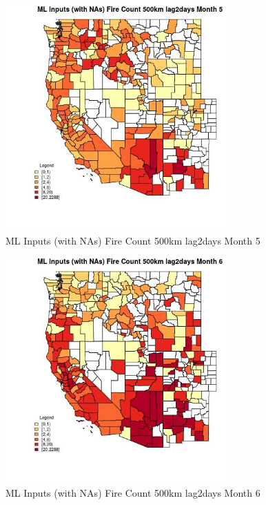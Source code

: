 \begin{figure} 
\centering  
\includegraphics[width=0.77\textwidth]{Code_Outputs/Report_ML_input_PM25_Step4_part_e_de_duplicated_aves_compiled_2019-05-20wNAs_CountyFire_Count_500km_lag2daysmedianMonth5.jpg} 
\caption{\label{fig:Report_ML_input_PM25_Step4_part_e_de_duplicated_aves_compiled_2019-05-20wNAsCountyFire_Count_500km_lag2daysmedianMonth5}ML Inputs (with NAs) Fire Count 500km lag2days Month 5} 
\end{figure} 
 

\begin{figure} 
\centering  
\includegraphics[width=0.77\textwidth]{Code_Outputs/Report_ML_input_PM25_Step4_part_e_de_duplicated_aves_compiled_2019-05-20wNAs_CountyFire_Count_500km_lag2daysmedianMonth6.jpg} 
\caption{\label{fig:Report_ML_input_PM25_Step4_part_e_de_duplicated_aves_compiled_2019-05-20wNAsCountyFire_Count_500km_lag2daysmedianMonth6}ML Inputs (with NAs) Fire Count 500km lag2days Month 6} 
\end{figure} 
 

